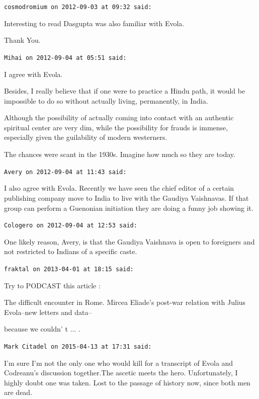 \begin{footnotesize}
\begin{sffamily}
\texttt{cosmodromium on 2012-09-03 at 09:32 said:}

Interesting to read Dasgupta was also familiar with Evola.

Thank You.

\hfill

\texttt{Mihai on 2012-09-04 at 05:51 said:}

I agree with Evola.

Besides, I really believe that if one were to practice a Hindu path, it would be impossible to do so without actually living, permanently, in India.

Although the possibility of actually coming into contact with an authentic spiritual center are very dim, while the possibility for frauds is immense, especially given the guilability of modern westerners.

The chances were scant in the 1930s. Imagine how much so they are today.

\hfill

\texttt{Avery on 2012-09-04 at 11:43 said:}

I also agree with Evola. Recently we have seen the chief editor of a certain publishing company move to India to live with the Gaudiya Vaishnavas. If that group can perform a Guenonian initiation they are doing a funny job showing it.

\hfill

\texttt{Cologero on 2012-09-04 at 12:53 said:}

One likely reason, Avery, is that the Gaudiya Vaishnava is open to foreigners and not restricted to Indians of a specific caste.

\hfill

\texttt{fraktal on 2013-04-01 at 18:15 said:}

Try to PODCAST this article :

The difficult encounter in Rome. Mircea Eliade's post-war relation with Julius Evola--new letters and data--

because we couldn' t ... .

\hfill

\texttt{Mark Citadel on 2015-04-13 at 17:31 said:}

I'm sure I'm not the only one who would kill for a transcript of Evola and Codreanu's discussion together.The ascetic meets the hero. Unfortunately, I highly doubt one was taken. Lost to the passage of history now, since both men are dead.


\end{sffamily}
\end{footnotesize}

